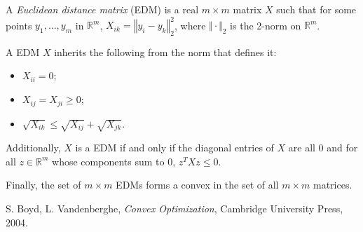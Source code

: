 \documentclass[12pt]{article}
\begin{document}
A \emph{Euclidean distance matrix} (EDM) is a real $m\times m$ matrix $X$ such that for some points $y_1,\ldots,y_m$ in $\mathbb{R}^m$, $X_{ik}=\left\Vert y_i-y_k\right\Vert_2^2$, where $\Vert\cdot\Vert_2$ is the 2-norm on $\mathbb{R}^m$.
\par\bigskip
A EDM $X$ inherits the following  from the norm that defines it:
\begin{itemize}
\item $X_{ii}=0$;
\item $X_{ij}=X_{ji}\ge 0$;
\item $\sqrt{X_{ik}}\le\sqrt{X_{ij}}+\sqrt{X_{jk}}$.
\end{itemize}
\par
Additionally, $X$ is a EDM if and only if the diagonal entries of $X$ are all 0 and for all $z\in\mathbb{R}^m$ whose components sum to 0, $z^TXz\le 0$.
\par
Finally, the set of $m\times m$ EDMs forms a convex  in the set of all $m\times m$ matrices.
\par\bigskip
\begin{thebibliography}{4}
 S. Boyd, L. Vandenberghe, \emph{Convex Optimization}, Cambridge University Press, 2004.
\end{thebibliography}
\end{document}
